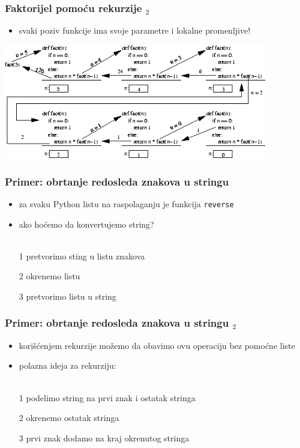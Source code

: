 \documentclass[utf8,compress]{beamer}
\begin{document}
\begin{frame}[fragile]
  \frametitle{Faktorijel pomoću rekurzije $_2$}
  \begin{itemize}
    \item svaki poziv funkcije ima svoje parametre i lokalne promenljive!
  \end{itemize}
  \begin{center}
    \includegraphics[width=11.5cm]{pic26}
  \end{center}
\end{frame}

\begin{frame}[fragile]
  \frametitle{Primer: obrtanje redosleda znakova u stringu}
  \begin{itemize}
    \item za svaku Python listu na raspolaganju je funkcija \texttt{reverse}
    \item ako hoćemo da konvertujemo string? \\ \ \\
    \item[1] pretvorimo sting u listu znakova
    \item[2] okrenemo listu
    \item[3] pretvorimo listu u string
  \end{itemize}
\end{frame}

\begin{frame}[fragile]
  \frametitle{Primer: obrtanje redosleda znakova u stringu $_2$}
  \begin{itemize}
    \item korišćenjem rekurzije možemo da obavimo ovu operaciju bez pomoćne liste
    \item polazna ideja za rekurziju: \\ \ \\
    \item[1] podelimo string na prvi znak i ostatak stringa
    \item[2] okrenemo ostatak stringa
    \item[3] prvi znak dodamo na kraj okrenutog stringa
  \end{itemize}
\end{frame}
\end{document}
